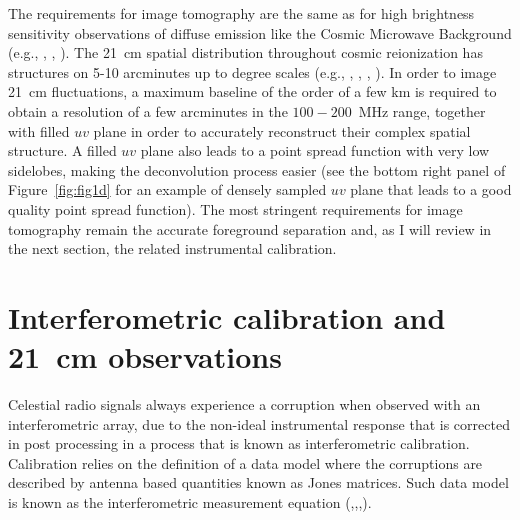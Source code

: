 The requirements for image tomography are the same as for high brightness sensitivity observations of diffuse emission like the Cosmic Microwave Background (e.g., \cite{halverson02}, \cite{dickinson04}, \cite{readhead04}). The 21~cm spatial distribution throughout cosmic reionization has structures on 5-10 arcminutes up to degree scales (e.g., \cite{majumdar12}, \cite{datta12}, \cite{mellema13}, \cite{kakiichi17}). In order to image 21~cm fluctuations, a maximum baseline of the order of a few km is required to obtain a resolution of a few arcminutes in the $100-200$~MHz range, together with filled $uv$ plane in order to accurately reconstruct their complex spatial structure. A filled $uv$ plane also leads to a point spread function with very low sidelobes, making the deconvolution process easier (see the bottom right panel of Figure~\ref{fig:fig1d} for an example of densely sampled $uv$ plane that leads to a good quality point spread function). The most stringent requirements for image tomography remain the accurate foreground separation and, as I will review in the next section, the related instrumental calibration.



\section{Interferometric calibration and 21~cm observations}
\label{sec:calibration}

Celestial radio signals always experience a corruption when observed with an interferometric array, due to the non-ideal instrumental response that is corrected in post processing in a process that is known as interferometric calibration. Calibration relies on the definition of a data model where the corruptions are described by antenna based quantities known as Jones matrices. Such data model is known as the interferometric measurement equation (\cite{hamaker96},\cite{smirnov11},\cite{smirnov11b},\cite{smirnov11c}).

